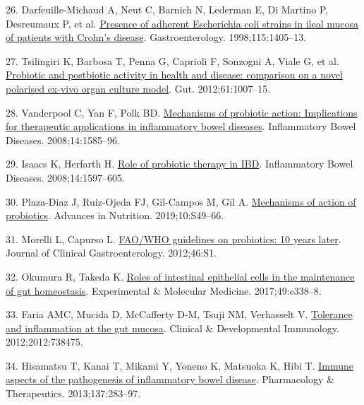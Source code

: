 \documentclass[
  12pt,
  a4paper,
  twoside,
  openright]{book}
\newlength{\cslhangindent}
\newlength{\cslentryspacingunit} %
\newenvironment{CSLReferences}[2] %
 {%
  \setlength{\parindent}{0pt}
  \ifodd #1
  \let\oldpar\par
  \def\par{\hangindent=\cslhangindent\oldpar}
  \fi
  \setlength{\parskip}{#2\cslentryspacingunit}
 }%
 {}
\begin{document}
\begin{CSLReferences}{0}{0}
\leavevmode{}%
26. Darfeuille-Michaud A, Neut C, Barnich N, Lederman E, Di Martino P, Desreumaux P, et al. \href{https://doi.org/10.1016/S0016-5085(98)70019-8}{Presence of adherent Escherichia coli strains in ileal mucosa of patients with Crohn's disease}. Gastroenterology. 1998;115:1405--13.

\leavevmode{}%
27. Tsilingiri K, Barbosa T, Penna G, Caprioli F, Sonzogni A, Viale G, et al. \href{https://doi.org/10.1136/gutjnl-2011-300971}{Probiotic and postbiotic activity in health and disease: comparison on a novel polarised ex-vivo organ culture model}. Gut. 2012;61:1007--15.

\leavevmode{}%
28. Vanderpool C, Yan F, Polk BD. \href{https://doi.org/10.1002/ibd.20525}{Mechanisms of probiotic action: Implications for therapeutic applications in inflammatory bowel diseases}. Inflammatory Bowel Diseases. 2008;14:1585--96.

\leavevmode{}%
29. Isaacs K, Herfarth H. \href{https://doi.org/10.1002/ibd.20465}{Role of probiotic therapy in IBD}. Inflammatory Bowel Diseases. 2008;14:1597--605.

\leavevmode{}%
30. Plaza-Diaz J, Ruiz-Ojeda FJ, Gil-Campos M, Gil A. \href{https://doi.org/10.1093/advances/nmy063}{Mechanisms of action of probiotics}. Advances in Nutrition. 2019;10:S49--66.

\leavevmode{}%
31. Morelli L, Capurso L. \href{https://doi.org/10.1097/MCG.0b013e318269fdd5}{FAO/WHO guidelines on probiotics: 10 years later}. Journal of Clinical Gastroenterology. 2012;46:S1.

\leavevmode{}%
32. Okumura R, Takeda K. \href{https://doi.org/10.1038/emm.2017.20}{Roles of intestinal epithelial cells in the maintenance of gut homeostasis}. Experimental \& Molecular Medicine. 2017;49:e338--8.

\leavevmode{}%
33. Faria AMC, Mucida D, McCafferty D-M, Tsuji NM, Verhasselt V. \href{https://doi.org/10.1155/2012/738475}{Tolerance and inflammation at the gut mucosa}. Clinical \& Developmental Immunology. 2012;2012:738475.

\leavevmode{}%
34. Hisamatsu T, Kanai T, Mikami Y, Yoneno K, Matsuoka K, Hibi T. \href{https://doi.org/10.1016/j.pharmthera.2012.10.008}{Immune aspects of the pathogenesis of inflammatory bowel disease}. Pharmacology \& Therapeutics. 2013;137:283--97.


\end{CSLReferences}
\end{document}
